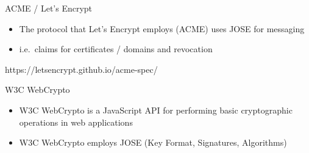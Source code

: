 \begin{frame}{ACME / Let's Encrypt}

\begin{itemize}
\itemsep1pt\parskip0pt
\item
  The protocol that Let's Encrypt employs (ACME) uses JOSE for messaging
\item
  i.e.~claims for certificates / domains and revocation
\end{itemize}

https://letsencrypt.github.io/acme-spec/

\end{frame}

\begin{frame}{W3C WebCrypto}

\begin{itemize}
\itemsep1pt\parskip0pt
\item
  W3C WebCrypto is a JavaScript API for performing basic cryptographic
  operations in web applications
\item
  W3C WebCrypto employs JOSE (Key Format, Signatures, Algorithms)
\end{itemize}

\end{frame}
